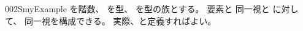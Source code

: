 \documentclass[index]{subfiles}
\begin{document}
\begin{myBlock}{002S}{myExample}
  を階数、
  を型、
  を型の族とする。
  要素と
  同一視と
  に対して、
  同一視を構成できる。
  実際、と定義すればよい。
\end{myBlock}
\end{document}
